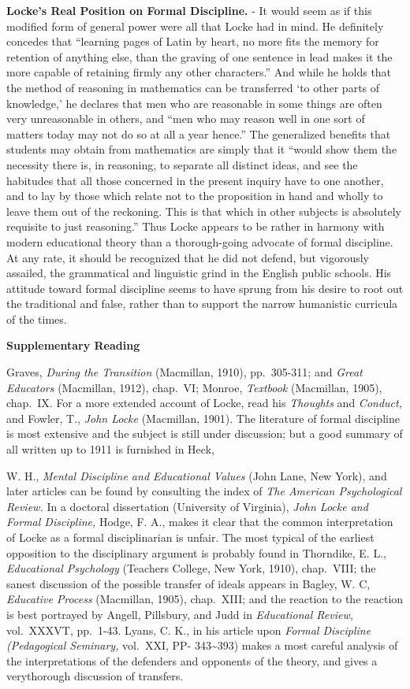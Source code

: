 \documentclass[
]{book}
\begin{document}
\textbf{Locke's Real Position on Formal Discipline.} - It would seem as if this modified form of general power were all that Locke had in mind. He definitely concedes that ``learning pages of Latin by heart, no more fits the memory for retention of anything else, than the graving of one sentence in lead makes it the more capable of retaining firmly any other characters.'' And while he holds that the method of reasoning in mathematics can be transferred `to other parts of knowledge,' he declares that men who are reasonable in some things are often very unreasonable in others, and ``men who may reason well in one sort of matters today may not do so at all a year hence.'' The generalized benefits that students may obtain from mathematics are simply that it ``would show them the necessity there is, in reasoning, to separate all distinct ideas, and see the habitudes that all those concerned in the present inquiry have to one another, and to lay by those which relate not to the proposition in hand and wholly to leave them out of the reckoning. This is that which in other subjects is absolutely requisite to just reasoning.'' Thus Locke appears to be rather in harmony with modern educational theory than a thorough-going advocate of formal discipline. At any rate, it should be recognized that he did not defend, but vigorously assailed, the grammatical and linguistic grind in the English public schools. His attitude toward formal discipline seems to have sprung from his desire to root out the traditional and false, rather than to support the narrow humanistic curricula of the times.

\textbf{Supplementary Reading}

Graves, \emph{During the Transition} (Macmillan, 1910), pp.~305-311; and \emph{Great Educators} (Macmillan, 1912), chap.~VI; Monroe, \emph{Textbook} (Macmillan, 1905), chap.~IX. For a more extended account of Locke, read his \emph{Thoughts} and \emph{Conduct,} and Fowler, T., \emph{John Locke} (Macmillan, 1901). The literature of formal discipline is most extensive and the subject is still under discussion; but a good summary of all written up to 1911 is furnished in Heck,

W. H., \emph{Mental Discipline and Educational Values} (John Lane, New York), and later articles can be found by consulting the index of \emph{The American Psychological Review.} In a doctoral dissertation (University of Virginia), \emph{John Locke and Formal Discipline,} Hodge, F. A., makes it clear that the common interpretation of Locke as a formal disciplinarian is unfair. The most typical of the earliest opposition to the disciplinary argument is probably found in Thorndike, E. L., \emph{Educational Psychology} (Teachers College, New York, 1910), chap.~VIII; the sanest discussion of the possible transfer of ideals appears in Bagley, W. C, \emph{Educative Process} (Macmillan, 1905), chap.~XIII; and the reaction to the reaction is best portrayed by Angell, Pillsbury, and Judd in \emph{Educational Review,} vol.~XXXVT, pp.~1-43. Lyans, C. K., in his article upon \emph{Formal Discipline (Pedagogical Seminary,} vol.~XXI, PP- 343\textasciitilde393) makes a most careful analysis of the interpretations of the defenders and opponents of the theory, and gives a verythorough discussion of transfers.
\end{document}
